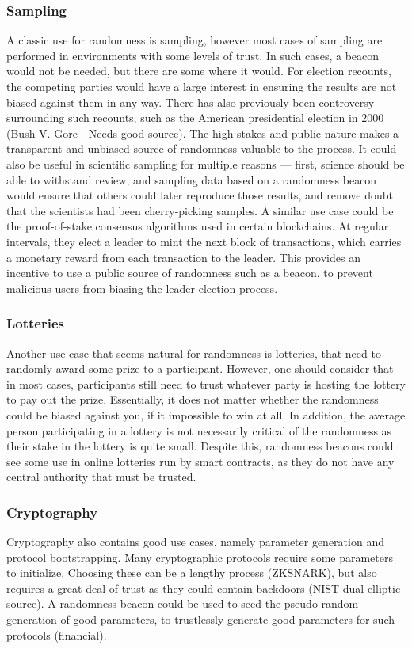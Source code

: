 \subsubsection{Sampling}
A classic use for randomness is sampling, however most cases of sampling are performed in environments with some levels of trust. In such cases, a beacon would not be needed, but there are some where it would. For election recounts, the competing parties would have a large interest in ensuring the results are not biased against them in any way. There has also previously been controversy surrounding such recounts, such as the American presidential election in 2000 (Bush V. Gore - Needs good source). The high stakes and public nature makes a transparent and unbiased source of randomness valuable to the process.
It could also be useful in scientific sampling for multiple reasons --- first, science should be able to withstand review, and sampling data based on a randomness beacon would ensure that others could later reproduce those results, and remove doubt that the scientists had been cherry-picking samples.
A similar use case could be the proof-of-stake consensus algorithms used in certain blockchains. At regular intervals, they elect a leader to mint the next block of transactions, which carries a monetary reward from each transaction to the leader. This provides an incentive to use a public source of randomness such as a beacon, to prevent malicious users from biasing the leader election process.

\subsubsection{Lotteries}
Another use case that seems natural for randomness is lotteries, that need to randomly award some prize to a participant. However, one should consider that in most cases, participants still need to trust whatever party is hosting the lottery to pay out the prize. Essentially, it does not matter whether the randomness could be biased against you, if it impossible to win at all.
In addition, the average person participating in a lottery is not necessarily critical of the randomness as their stake in the lottery is quite small.
Despite this, randomness beacons could see some use in online lotteries run by smart contracts, as they do not have any central authority that must be trusted.

\subsubsection{Cryptography}
Cryptography also contains good use cases, namely parameter generation and protocol bootstrapping. Many cryptographic protocols require some parameters to initialize. Choosing these can be a lengthy process (ZKSNARK), but also requires a great deal of trust as they could contain backdoors (NIST dual elliptic source). A randomness beacon could be used to seed the pseudo-random generation of good parameters, to trustlessly generate good parameters for such protocols (financial).

